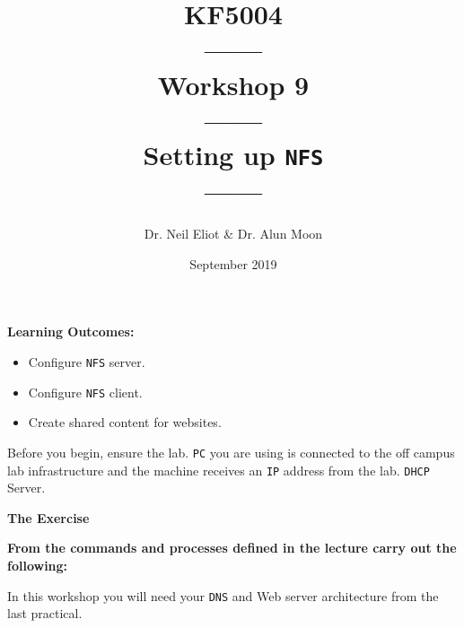 \documentclass[11pt]{article}
\begin{document}
\author{Dr. Neil Eliot \& Dr. Alun Moon}
\title{KF5004\\------\\Workshop 9\\------\\Setting up \texttt{NFS}\\------}
\date{September 2019}
\maketitle

\newpage



\noindent\textbf{Learning Outcomes:}
\begin{itemize}
    \item Configure \texttt{NFS} server.
    \item Configure \texttt{NFS} client.
    \item Create shared content for websites.
\end{itemize}


\begin{tcolorbox}[title={\textbf{Important:}}]
    Before you begin, ensure the lab. \texttt{PC} you are using is connected to the off campus lab infrastructure and the machine receives an \texttt{IP} address from the lab. \texttt{DHCP} Server.
\end{tcolorbox}
\newpage

\noindent\textbf{The Exercise}\\
\begin{tcolorbox}[colback=blue!20]
    \noindent\textbf{From the commands and processes defined in the lecture carry out the following:}
\end{tcolorbox}


\begin{tcolorbox}[title={\textbf{NOTE:}}]
    In this workshop you will need your \texttt{DNS} and Web server architecture from the last practical.
\end{tcolorbox}
\end{document}

